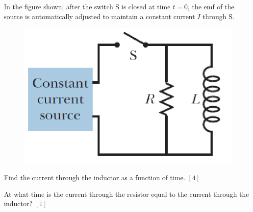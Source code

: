 \begin{problem}
    In the figure shown, after the switch S is closed at time $t = 0$, the emf of the source is automatically adjusted to maintain a constant current $I$ through S.
    \begin{figure}[H]
        \centering
        \includegraphics{spho_book_TYS_images/2021SPhO_4.png}
    \end{figure}
    \begin{subproblemalph}
        \item Find the current through the inductor as
a function of time. \hfill $[4]$
        \item At what time is the current through the
resistor equal to the current through the
inductor? \hfill $[1]$
    \end{subproblemalph} 
\end{problem}

